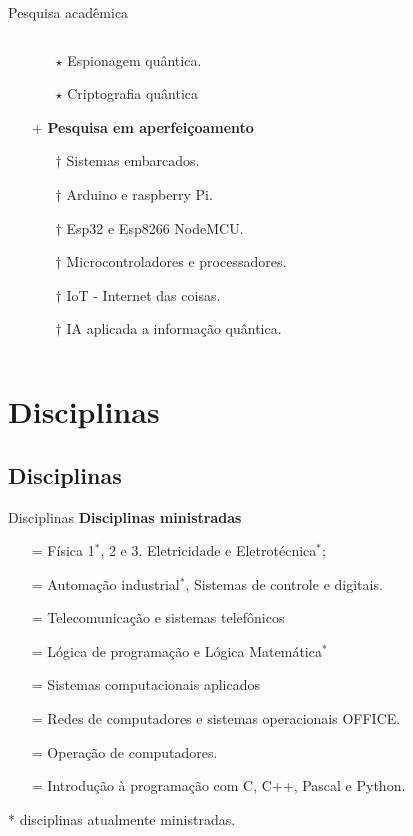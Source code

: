 \documentclass{beamer}
\begin{document}
\begin{frame}{Pesquisa acadêmica}
\begin{columns}[T]
\begin{column}{.75\textwidth}
\begin{itemize}
\begin{itemize}
                    \item [$\star$] Espionagem quântica.
                    \item [$\star$] Criptografia quântica
                \end{itemize}
                \pause
                \item [+] \textbf{Pesquisa em aperfeiçoamento}
                \begin{itemize}
                    \item [$\dagger$] Sistemas embarcados.
                    \item [$\dagger$] Arduino e raspberry Pi.
                    \item [$\dagger$] Esp32 e Esp8266 NodeMCU.
                    \item [$\dagger$] Microcontroladores e processadores.
                    \item [$\dagger$] IoT - Internet das coisas.
                    \item [$\dagger$] IA aplicada a informação quântica.
                \end{itemize} 
            \end{itemize}
        \end{column}
    \end{columns}
\end{frame}
\section{Disciplinas}
%
\subsection{Disciplinas}
%
\begin{frame}{Disciplinas}
    \transblindshorizontal
    \textbf{Disciplinas ministradas}
        \begin{itemize}
            \item [=] Física 1$^*$, 2 e 3. Eletricidade e Eletrotécnica$^*$;
            \item [=] Automação industrial$^*$, Sistemas de controle e digitais.
            \item [=] Telecomunicação e sistemas telefônicos
            \item [=] Lógica de programação e Lógica Matemática$^*$
            \item [=] Sistemas computacionais aplicados
            \item [=] Redes de computadores e sistemas operacionais OFFICE.
            \item [=] Operação de computadores.
            \item [=] Introdução à programação com C, C++, Pascal e Python.
        \end{itemize}
        * disciplinas atualmente ministradas.
\end{frame}
%
\end{document}
